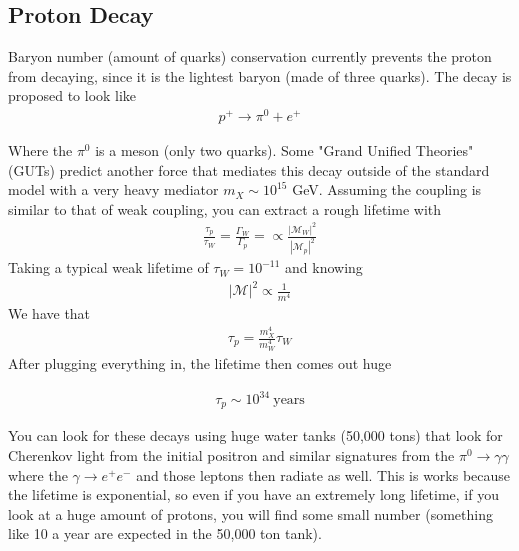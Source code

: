 \subsection{Proton Decay}
Baryon number (amount of quarks) conservation currently prevents the proton from decaying, since it is the lightest baryon (made of three quarks). The decay is proposed to look like
\begin{align}
    p^+ \rightarrow \pi^0 + e^+
\end{align}

Where the $\pi^0$ is a meson (only two quarks). Some "Grand Unified Theories" (GUTs) predict another force that mediates this decay outside of the standard model with a very heavy mediator $m_X \sim 10^{15}$ GeV. Assuming the coupling is similar to that of weak coupling, you can extract a rough lifetime with
\begin{align}
\frac{\tau_p}{\tau_W} = \frac{\Gamma_W}{\Gamma_p} = \propto\frac{|\mathcal{M}_W|^2}{|\mathcal{M}_p|^2}
\end{align}
Taking a typical weak lifetime of $\tau_W = 10^{-11}$ and knowing
\begin{align}
|\mathcal{M}|^2\propto\frac{1}{m^4}
\end{align}
We have that \begin{align}
\tau_p = \frac{m_X^4}{m_W^4}\tau_W
\end{align}
After plugging everything in, the lifetime then comes out huge

\begin{align}
    \tau_p \sim 10^{34} ~\textrm{years}
\end{align}

You can look for these decays using huge water tanks (50,000 tons) that look for Cherenkov light from the initial positron and similar signatures from the $\pi^0 \rightarrow \gamma\gamma$ where the $\gamma\rightarrow e^+e^-$ and those leptons then radiate as well. This is works because the lifetime is exponential, so even if you have an extremely long lifetime, if you look at a huge amount of protons, you will find some small number (something like 10 a year are expected in the 50,000 ton tank).


%


